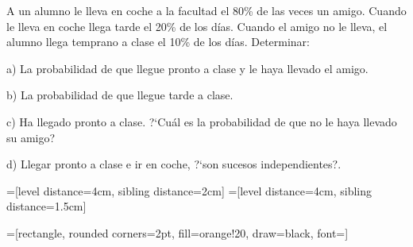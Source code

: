 		
\vspace{5mm}
\begin{ejemplo}
\begin{ejer}
A un alumno le lleva en coche a la facultad el 80\% de las veces un amigo. Cuando le lleva en coche llega tarde el 20\% de los días. Cuando el amigo no le lleva, el alumno llega temprano a clase el 10\% de los días. Determinar:

a)  La probabilidad de que llegue pronto a clase y le haya llevado el amigo.

b)  La probabilidad de que llegue tarde a clase.

c)  Ha llegado pronto a clase. ?`Cuál es la probabilidad de que no le haya llevado su amigo?

d)  Llegar pronto a clase e ir en coche, ?`son sucesos independientes?.	
\end{ejer}
\end{ejemplo}
=[level distance=4cm, sibling distance=2cm]
=[level distance=4cm, sibling distance=1.5cm]


=[rectangle, rounded corners=2pt, fill=orange!20, draw=black, font=\small]

\begin{center}
\end{center}

